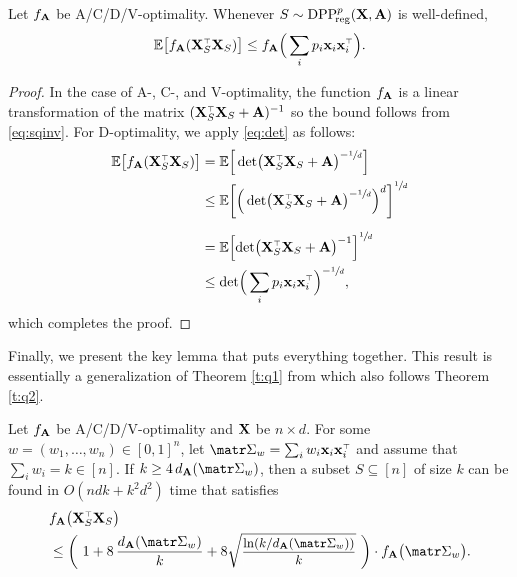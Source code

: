 \documentclass[../../thesis.tex]{subfiles}
\begin{document}
\begin{corollary}\label{c:expectations}
  Let $f_{\mathbf A}$ be A/C/D/V-optimality. Whenever $S\sim{{\mathrm{DPP}}_{\!\mathrm{reg}}^{p}}(\mathbf X,\mathbf A)$ is
  well-defined,
  \begin{align*}
    \E\big[f_{\A}(\X_S^\top\X_S)\big] \leq f_{\A}\Big(\sum_i p_i\x_i\x_i^\top\Big).
  \end{align*}
\end{corollary}
\begin{proof}
  In the case of A-, C-, and V-optimality, the function $f_{\mathbf A}$ is a
  linear transformation of the matrix $(\X_S^\top\X_S+\A)^{-1}$ so the
  bound follows from \eqref{eq:sqinv}. For D-optimality, we apply
  \eqref{eq:det} as follows:
  \begin{align*}
    \E\big[f_{\A}(\X_S^\top\X_S)\big]
     & = \E\Big[\det\!\big(\X_S^\top\X_S+\A\big)^{-\sfrac1d}\Big]                     \\
     & \leq
    \E\bigg[\Big(\det\!\big(\X_S^\top\X_S+\A\big)^{-\sfrac1d}\Big)^d\bigg]^{\sfrac1d} \\
    \\ &=  \E\Big[\!\det\!\big(\X_S^\top\X_S+\A\big)^{-1}\Big]^{\sfrac1d}\\
     & \leq
    \det\!\Big(\sum_i p_i\x_i\x_i^\top\Big)^{-\sfrac1d},
  \end{align*}
  which completes the proof.
\end{proof}
Finally, we present the key lemma that puts everything together. This
result is essentially a generalization of Theorem \ref{t:q1} from
which also follows Theorem \ref{t:q2}.
\begin{lemma}\label{l:guarantees}
  Let $f_{\mathbf A}$ be A/C/D/V-optimality and $\mathbf X$ be $n\times
    d$.  For some $w=(w_1,\dots,w_n)\in[0,1]^n$, let
  $\Sigmab_w=\sum_iw_i\x_i\x_i^\top$ and assume that
  $\sum_i w_i=k\in[n]$. If $k\geq 4\,d_{\A}(\Sigmab_w)$, then a
  subset $S\subseteq[n]$ of size $k$ can be found in $O(ndk+k^2d^2)$ time that satisfies
  \begin{align*}
     & f_{\A}\big(\X_S^\top\X_S\big)                                                                                                            \\
     & \leq \bigg(\ 1+8\,\frac{d_{\A}(\Sigmab_w)}{k} + 8\sqrtshort{\frac{\ln (k/d_{\A}(\Sigmab_w))}{k}}\ \bigg)\cdot f_{\A}\big(\Sigmab_w\big).
  \end{align*}
\end{lemma}
\end{document}

